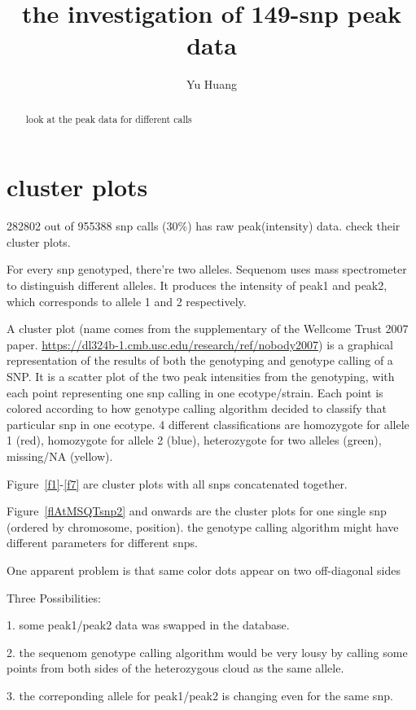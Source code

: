 \documentclass[a4paper,10pt]{article}
\title{the investigation of 149-snp peak data}
\author{Yu Huang}
\begin{document}
\maketitle

\begin{abstract}
look at the peak data for different calls
\end{abstract}

\tableofcontents


\section{cluster plots}
282802 out of 955388 snp calls (30\%) has raw peak(intensity) data. check their cluster plots.

For every snp genotyped, there're two alleles. Sequenom uses mass spectrometer to distinguish different alleles. It produces the intensity of peak1 and peak2, which corresponds to allele 1 and 2 respectively.

A cluster plot (name comes from the supplementary of the Wellcome Trust 2007 paper. \url{https://dl324b-1.cmb.usc.edu/research/ref/nobody2007}) is a graphical representation of the results of both the genotyping and genotype calling of a SNP. It is a scatter plot of the two peak intensities from the genotyping, with each point representing one snp calling in one ecotype/strain. Each point is colored according to how genotype calling algorithm decided to classify that particular snp in one ecotype. 4 different classifications are homozygote for allele 1 (red), homozygote for allele 2 (blue), heterozygote for two alleles (green), missing/NA (yellow).

Figure~\ref{f1}-\ref{f7} are cluster plots with all snps concatenated together.

Figure~\ref{flAtMSQTsnp2} and onwards are the cluster plots for one single snp (ordered by chromosome, position). the genotype calling algorithm might have different parameters for different snps.

One apparent problem is that same color dots appear on two off-diagonal sides

Three Possibilities:

1. some peak1/peak2 data was swapped in the database.

2. the sequenom genotype calling algorithm would be very lousy by calling some points from both sides of the heterozygous cloud as the same allele.

3. the correponding allele for peak1/peak2 is changing even for the same snp.
\end{document}
